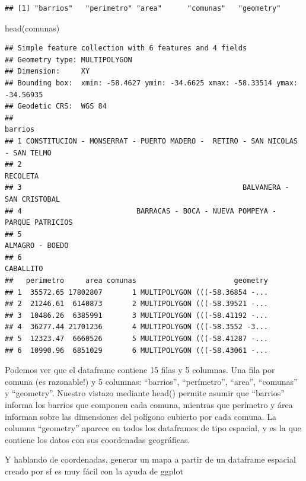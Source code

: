 \documentclass[
]{book}
\newenvironment{Shaded}{\begin{snugshade}}{\end{snugshade}}
\newcommand{\FunctionTok}[1]{\textcolor[rgb]{0.00,0.00,0.00}{#1}}
\newcommand{\NormalTok}[1]{#1}
\begin{document}
\begin{verbatim}
## [1] "barrios"   "perimetro" "area"      "comunas"   "geometry"
\end{verbatim}

\begin{Shaded}
\begin{Highlighting}[]
\FunctionTok{head}\NormalTok{(comunas)}
\end{Highlighting}
\end{Shaded}

\begin{verbatim}
## Simple feature collection with 6 features and 4 fields
## Geometry type: MULTIPOLYGON
## Dimension:     XY
## Bounding box:  xmin: -58.4627 ymin: -34.6625 xmax: -58.33514 ymax: -34.56935
## Geodetic CRS:  WGS 84
##                                                                        barrios
## 1 CONSTITUCION - MONSERRAT - PUERTO MADERO -  RETIRO - SAN NICOLAS - SAN TELMO
## 2                                                                     RECOLETA
## 3                                                    BALVANERA - SAN CRISTOBAL
## 4                           BARRACAS - BOCA - NUEVA POMPEYA - PARQUE PATRICIOS
## 5                                                              ALMAGRO - BOEDO
## 6                                                                    CABALLITO
##   perimetro     area comunas                       geometry
## 1  35572.65 17802807       1 MULTIPOLYGON (((-58.36854 -...
## 2  21246.61  6140873       2 MULTIPOLYGON (((-58.39521 -...
## 3  10486.26  6385991       3 MULTIPOLYGON (((-58.41192 -...
## 4  36277.44 21701236       4 MULTIPOLYGON (((-58.3552 -3...
## 5  12323.47  6660526       5 MULTIPOLYGON (((-58.41287 -...
## 6  10990.96  6851029       6 MULTIPOLYGON (((-58.43061 -...
\end{verbatim}

Podemos ver que el dataframe contiene 15 filas y 5 columnas. Una fila por comuna (es razonable!) y 5 columnas: ``barrios'', ``perímetro'', ``area'', ``comunas'' y ``geometry''. Nuestro vistazo mediante head() permite asumir que ``barrios'' informa los barrios que componen cada comuna, mientras que perímetro y área informan sobre las dimensiones del polígono cubierto por cada comuna. La columna ``geometry'' aparece en todos los dataframes de tipo espacial, y es la que contiene los datos con sus coordenadas geográficas.

Y hablando de coordenadas, generar un mapa a partir de un dataframe espacial creado por sf es muy fácil con la ayuda de ggplot
\end{document}
